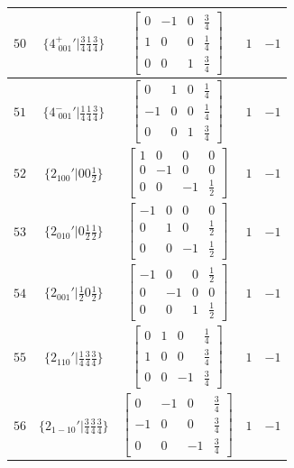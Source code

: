 \documentclass[fleqn,8pt]{jsarticle}
\begin{document}
\begin{longtable}{ccccc}
$ 50 $ & $ \{4^{+}_{\,\,001}{}'|\frac{3}{4} \frac{1}{4} \frac{3}{4}\} $ & $ \begin{bmatrix} 0 & -1 & 0 & \frac{3}{4} \\ 1 & 0 & 0 & \frac{1}{4} \\ 0 & 0 & 1 & \frac{3}{4} \end{bmatrix} $ & $ 1 $ & $ -1 $ \\ \hline
$ 51 $ & $ \{4^{-}_{\,\,001}{}'|\frac{1}{4} \frac{1}{4} \frac{3}{4}\} $ & $ \begin{bmatrix} 0 & 1 & 0 & \frac{1}{4} \\ -1 & 0 & 0 & \frac{1}{4} \\ 0 & 0 & 1 & \frac{3}{4} \end{bmatrix} $ & $ 1 $ & $ -1 $ \\ \hline
$ 52 $ & $ \{2{}_{100}{}'|0 0 \frac{1}{2}\} $ & $ \begin{bmatrix} 1 & 0 & 0 & 0 \\ 0 & -1 & 0 & 0 \\ 0 & 0 & -1 & \frac{1}{2} \end{bmatrix} $ & $ 1 $ & $ -1 $ \\ \hline
$ 53 $ & $ \{2{}_{010}{}'|0 \frac{1}{2} \frac{1}{2}\} $ & $ \begin{bmatrix} -1 & 0 & 0 & 0 \\ 0 & 1 & 0 & \frac{1}{2} \\ 0 & 0 & -1 & \frac{1}{2} \end{bmatrix} $ & $ 1 $ & $ -1 $ \\ \hline
$ 54 $ & $ \{2{}_{001}{}'|\frac{1}{2} 0 \frac{1}{2}\} $ & $ \begin{bmatrix} -1 & 0 & 0 & \frac{1}{2} \\ 0 & -1 & 0 & 0 \\ 0 & 0 & 1 & \frac{1}{2} \end{bmatrix} $ & $ 1 $ & $ -1 $ \\ \hline
$ 55 $ & $ \{2{}_{110}{}'|\frac{1}{4} \frac{3}{4} \frac{3}{4}\} $ & $ \begin{bmatrix} 0 & 1 & 0 & \frac{1}{4} \\ 1 & 0 & 0 & \frac{3}{4} \\ 0 & 0 & -1 & \frac{3}{4} \end{bmatrix} $ & $ 1 $ & $ -1 $ \\ \hline
$ 56 $ & $ \{2{}_{1-10}{}'|\frac{3}{4} \frac{3}{4} \frac{3}{4}\} $ & $ \begin{bmatrix} 0 & -1 & 0 & \frac{3}{4} \\ -1 & 0 & 0 & \frac{3}{4} \\ 0 & 0 & -1 & \frac{3}{4} \end{bmatrix} $ & $ 1 $ & $ -1 $ \\ \hline

\end{longtable}
\end{document}
